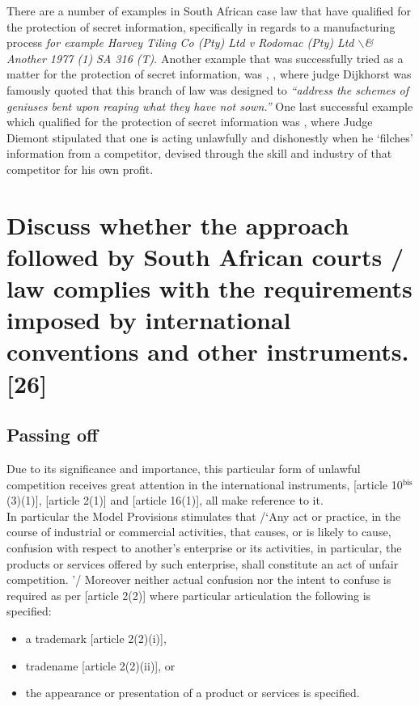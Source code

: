 \documentclass[11pt]{article}
\begin{document}
There are a number of examples in South African case law that have qualified for
the protection of secret information, specifically in regards to a manufacturing
process \emph{for example Harvey Tiling Co (Pty) Ltd v Rodomac (Pty) Ltd $\backslash$& Another
1977 (1) SA 316 (T)}. Another example that was successfully tried as a matter
for the protection of secret information, was
, \cite{dijkhorst81_atlas_v_pikkewyn}, where
judge Dijkhorst was famously quoted that this branch of law was designed to
\emph{``address the schemes of geniuses bent upon reaping what they have not sown.''}
One last successful example which qualified for the protection of secret
information was 
\cite{diemont72_stellwinetrust_v_oudemeester}, where Judge Diemont stipulated that
one is acting unlawfully and dishonestly when he `filches' information from a
competitor, devised through the skill and industry of that competitor for his
own profit.

\section{Discuss whether the approach followed by South African courts / law complies with the requirements imposed by international conventions and other instruments. [26]}
\label{sec:org14eb011}
\subsection{Passing off}
\label{sec:org6edae3f}
Due to its significance and importance, this particular form of unlawful competition receives great attention in the
international instruments, [article
10\(^{\text{bis}}\)(3)(1)]\cite{wipo83_paris_conve_protect_ip}, [article
2(1)]\cite{wipo96_model_provi_unfair_comp} and [article 16(1)]\cite{wto17_trips},
all make reference to it.\\

In particular  the Model Provisions stimulates that /‘Any act or practice, in the course of industrial or commercial
activities, that causes, or is likely to cause, confusion with
respect to another’s enterprise or its activities, in particular,
the products or services offered by such enterprise, shall
constitute an act of unfair competition. ’/ Moreover neither actual confusion nor the intent to confuse is required as per
[article 2(2)]\cite{wipo96_model_provi_unfair_comp} where particular articulation the following is specified:
\begin{itemize}
\item a trademark [article 2(2)(i)]\cite{wipo96_model_provi_unfair_comp},
\item tradename [article 2(2)(ii)]\cite{wipo96_model_provi_unfair_comp}, or
\item the appearance or presentation of a product or services is specified.
\end{itemize}
\end{document}
